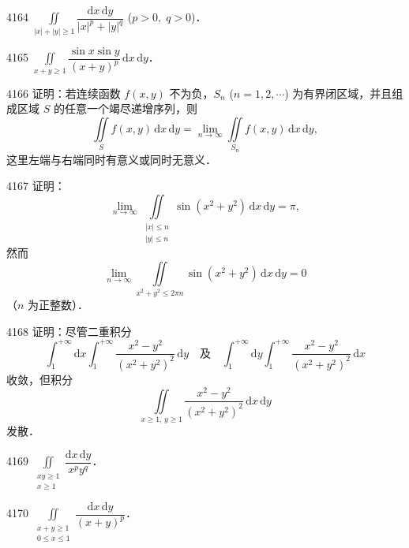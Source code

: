 \begin{prob}[S]{4164}
$\displaystyle\iint\limits_{|x|+|y| \geqslant 1} \dfrac{\mathrm{d}x\,\mathrm{d}y}{|x|^p + |y|^q}$ ($p > 0,\; q > 0$)．
\end{prob}

\begin{prob}[S]{4165}
$\displaystyle\iint\limits_{x+y \geqslant 1} \dfrac{\sin x \sin y}{(x+y)^p} \,\mathrm{d}x\,\mathrm{d}y$．
\end{prob}

\begin{prob}[M]{4166}
证明：若连续函数 $f(x,y)$ 不为负，$S_n$ ($n = 1, 2, \cdots$) 为有界闭区域，并且组成区域 $S$ 的任意一个竭尽递增序列，则
\[
\iint\limits_S f(x,y) \,\mathrm{d}x\,\mathrm{d}y = \lim_{n \to \infty} \iint\limits_{S_n} f(x,y) \,\mathrm{d}x\,\mathrm{d}y,
\]
这里左端与右端同时有意义或同时无意义．
\end{prob}

\begin{prob}[M]{4167}
证明：
\[
\lim_{n \to \infty} \iint\limits_{\substack{|x| \leqslant n \\ |y| \leqslant n}} \sin(x^2 + y^2) \,\mathrm{d}x\,\mathrm{d}y = \pi,
\]
然而
\[
\lim_{n \to \infty} \iint\limits_{x^2+y^2 \leqslant 2\pi n} \sin(x^2 + y^2) \,\mathrm{d}x\,\mathrm{d}y = 0
\]
（$n$ 为正整数）．
\end{prob}

\begin{prob}[M]{4168}
证明：尽管二重积分
\[
\int_1^{+\infty} \mathrm{d}x \int_1^{+\infty} \dfrac{x^2 - y^2}{(x^2 + y^2)^2} \,\mathrm{d}y \quad \text{及} \quad \int_1^{+\infty} \mathrm{d}y \int_1^{+\infty} \dfrac{x^2 - y^2}{(x^2 + y^2)^2} \,\mathrm{d}x
\]
收敛，但积分
\[
\iint\limits_{x \geqslant 1,\, y \geqslant 1} \dfrac{x^2 - y^2}{(x^2 + y^2)^2} \,\mathrm{d}x\,\mathrm{d}y
\]
发散．
\end{prob}


\begin{prob}[S]{4169}
$\displaystyle\iint\limits_{\substack{xy \geqslant 1 \\ x \geqslant 1}} \dfrac{\mathrm{d}x\,\mathrm{d}y}{x^p y^q}$．
\end{prob}

\begin{prob}[S]{4170}
$\displaystyle\iint\limits_{\substack{x+y \geqslant 1 \\ 0 \leqslant x \leqslant 1}} \dfrac{\mathrm{d}x\,\mathrm{d}y}{(x+y)^p}$．
\end{prob}

